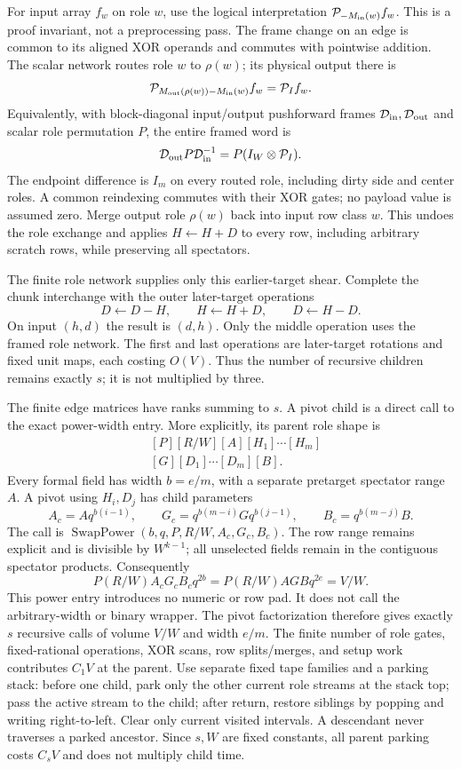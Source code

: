For input array $f_w$ on role $w$, use the logical interpretation
$\mathcal P_{-M_{\rm in}(w)}f_w$.  This is a proof invariant, not a
preprocessing pass.  The frame change on an edge is common to its aligned
XOR operands and commutes with pointwise addition.  The scalar network
routes role $w$ to $\rho(w)$; its physical output there is
\[
\mathcal P_{M_{\rm out}(\rho(w))-M_{\rm in}(w)}f_w
       =\mathcal P_I f_w.
\]
Equivalently, with block-diagonal input/output pushforward frames
$\mathcal D_{\rm in},\mathcal D_{\rm out}$ and scalar role
permutation $P$, the entire framed word is
\[
 \mathcal D_{\rm out}P\mathcal D_{\rm in}^{-1}
        =P(I_W\otimes\mathcal P_I).
\]
The endpoint difference is $I_m$ on every routed role, including dirty
side and center roles. A common reindexing commutes with their XOR
gates; no payload value is assumed zero.
Merge output role $\rho(w)$ back into input row class $w$.  This undoes
the role exchange and applies $H\gets H+D$ to every row, including
arbitrary scratch rows, while preserving all spectators.

The finite role network supplies only this earlier-target shear.  Complete
the chunk interchange with the outer later-target operations
\[
 D\gets D-H,\qquad H\gets H+D,\qquad D\gets H-D.
\]
On input $(h,d)$ the result is $(d,h)$.  Only the middle operation uses
the framed role network.  The first and last operations are later-target
rotations and fixed unit maps, each costing $O(V)$.  Thus the number of
recursive children remains exactly $s$; it is not multiplied by three.

The finite edge matrices have ranks summing to $s$. A pivot child is a
direct call to the exact power-width entry. More explicitly, its parent
role shape is
\[
\begin{aligned}
 &[P][R/W][A][H_1]\cdots[H_m]\\
 &[G][D_1]\cdots[D_m][B].
\end{aligned}
\]
Every formal field has width $b=e/m$, with a separate pretarget
spectator range $A$. A pivot using $H_i,D_j$ has child parameters
\[
 A_c=Aq^{b(i-1)},\qquad
 G_c=q^{b(m-i)}Gq^{b(j-1)},\qquad
 B_c=q^{b(m-j)}B.
\]
The call is
$\operatorname{SwapPower}(b,q,P,R/W,A_c,G_c,B_c)$.
The row range remains explicit and is divisible by $W^{k-1}$;
all unselected fields remain in the contiguous spectator products.
Consequently
\[
 P(R/W)A_cG_cB_cq^{2b}
   =P(R/W)AGBq^{2e}=V/W.
\]
This power entry introduces no numeric or row pad. It does not call
the arbitrary-width or binary wrapper. The pivot factorization
therefore gives exactly $s$ recursive calls of volume $V/W$ and
width $e/m$. The
finite number of role gates, fixed-rational operations, XOR scans, row
splits/merges, and setup work contributes $C_1V$ at the parent.  Use
separate fixed tape families and a parking stack: before one child, park
only the other current role streams at the stack top; pass the active
stream to the child; after return, restore siblings by popping and writing
right-to-left.  Clear only current visited intervals.  A descendant never
traverses a parked ancestor.  Since $s,W$ are fixed constants, all parent
parking costs $C_sV$ and does not multiply child time.

